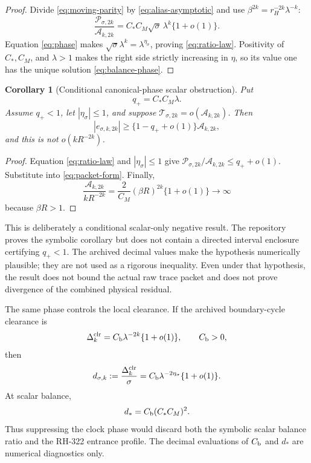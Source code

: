 \documentclass[11pt]{article}
\newtheorem{corollary}[theorem]{Corollary}
\theoremstyle{remark}
\newcommand{\1}{\mathbf 1}
\newcommand{\cA}{\mathcal A}
\newcommand{\cP}{\mathcal P}
\newcommand{\cT}{\mathcal T}
\begin{document}
\begin{proof}
Divide \eqref{eq:moving-parity} by \eqref{eq:alias-asymptotic} and use
$\beta^{2k}=r_H^{-2k}\lambda^{-k}$:
\[
 \frac{\cP_{\sigma,2k}}{\cA_{k,2k}}
 =C_*C_M\sqrt\sigma\,\lambda^k\{1+o(1)\}.
\]
Equation \eqref{eq:phase} makes
$\sqrt\sigma\lambda^k=\lambda^{\eta_\sigma}$, proving
\eqref{eq:ratio-law}.  Positivity of $C_*,C_M$, and $\lambda>1$ makes the
right side strictly increasing in $\eta$, so its value one has the unique
solution \eqref{eq:balance-phase}.
\end{proof}

\begin{corollary}[Conditional canonical-phase scalar obstruction]
\label{cor:conditional-obstruction}
Put
\begin{equation}
 q_+=C_*C_M\lambda.
 \label{eq:q-plus}
\end{equation}
Assume $q_+<1$, let $|\eta_\sigma|\le1$, and suppose
$\cT_{\sigma,2k}=o(\cA_{k,2k})$.  Then
\begin{equation}
 |e_{\sigma,k,2k}|
 \ge\{1-q_++o(1)\}\cA_{k,2k},
 \label{eq:scalar-obstruction}
\end{equation}
and this is not $o(kR^{-2k})$.
\end{corollary}

\begin{proof}
Equation \eqref{eq:ratio-law} and $|\eta_\sigma|\le1$ give
$\cP_{\sigma,2k}/\cA_{k,2k}\le q_++o(1)$.  Substitute into
\eqref{eq:packet-form}.  Finally,
\[
 \frac{\cA_{k,2k}}{kR^{-2k}}
 =\frac{2}{C_M}(\beta R)^{2k}\{1+o(1)\}\longrightarrow\infty
\]
because $\beta R>1$.
\end{proof}

This is deliberately a conditional scalar-only negative result.  The
repository proves the symbolic corollary but does not contain a directed
interval enclosure certifying $q_+<1$.  The archived decimal values make the
hypothesis numerically plausible; they are not used as a rigorous inequality.
Even under that hypothesis, the result does not bound the actual raw trace
packet and does not prove divergence of the combined physical residual.

The same phase controls the local clearance.  If the archived boundary-cycle
clearance is
\begin{equation}
 \Delta_k^{\rm clr}=C_{\rm b}\lambda^{-2k}\{1+o(1)\},
 \qquad C_{\rm b}>0,
 \label{eq:clearance}
\end{equation}
then
\begin{equation}
 d_{\sigma,k}:=\frac{\Delta_k^{\rm clr}}\sigma
 =C_{\rm b}\lambda^{-2\eta_\sigma}\{1+o(1)\}.
 \label{eq:clearance-phase}
\end{equation}
At scalar balance,
\begin{equation}
 d_*=C_{\rm b}(C_*C_M)^2.
 \label{eq:balance-clearance}
\end{equation}
Thus suppressing the clock phase would discard both the symbolic scalar
balance ratio and the RH-322 entrance profile.  The decimal evaluations of
$C_{\rm b}$ and $d_*$ are numerical diagnostics only.
\end{document}
